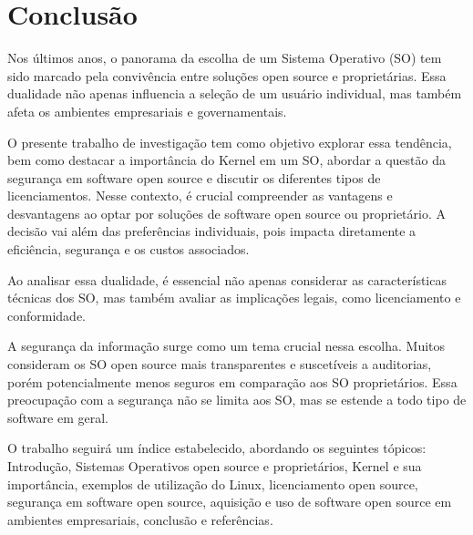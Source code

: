 \section{Conclusão} \label{section: introduction}
Nos últimos anos, o panorama da escolha de um Sistema Operativo (SO) tem sido marcado pela convivência entre soluções open source e proprietárias. Essa dualidade não apenas influencia a seleção de um usuário individual, mas também afeta os ambientes empresariais e governamentais.

O presente trabalho de investigação tem como objetivo explorar essa tendência, bem como destacar a importância do Kernel em um SO, abordar a questão da segurança em software open source e discutir os diferentes tipos de licenciamentos. Nesse contexto, é crucial compreender as vantagens e desvantagens ao optar por soluções de software open source ou proprietário. A decisão vai além das preferências individuais, pois impacta diretamente a eficiência, segurança e os custos associados.

Ao analisar essa dualidade, é essencial não apenas considerar as características técnicas dos SO, mas também avaliar as implicações legais, como licenciamento e conformidade.

A segurança da informação surge como um tema crucial nessa escolha. Muitos consideram os SO open source mais transparentes e suscetíveis a auditorias, porém potencialmente menos seguros em comparação aos SO proprietários. Essa preocupação com a segurança não se limita aos SO, mas se estende a todo tipo de software em geral.

O trabalho seguirá um índice estabelecido, abordando os seguintes tópicos: Introdução, Sistemas Operativos open source e proprietários, Kernel e sua importância, exemplos de utilização do Linux, licenciamento open source, segurança em software open source, aquisição e uso de software open source em ambientes empresariais, conclusão e referências.